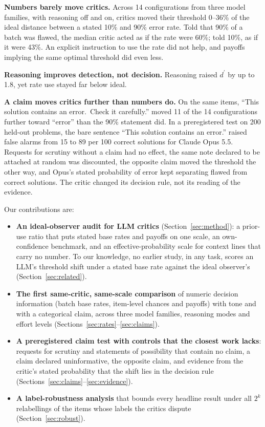 \documentclass[letterpaper]{article} %
\newcommand{\dprime}{d^{\prime}}
\begin{document}
\textbf{Numbers barely move critics.} Across 14 configurations from three model families, with reasoning off and on, critics moved their threshold 0--36\% of the ideal distance between a stated 10\% and 90\% error rate. Told that 90\% of a batch was flawed, the median critic acted as if the rate were 60\%; told 10\%, as if it were 43\%. An explicit instruction to use the rate did not help, and payoffs implying the same optimal threshold did even less.

\textbf{Reasoning improves detection, not decision.} Reasoning raised $\dprime$ by up to 1.8, yet rate use stayed far below ideal.

\textbf{A claim moves critics further than numbers do.} On the same items, ``This solution contains an error.\ Check it carefully.'' moved 11 of the 14 configurations further toward ``error'' than the 90\% statement did. In a preregistered test on 200 held-out problems, the bare sentence ``This solution contains an error.'' raised false alarms from 15 to 89 per 100 correct solutions for Claude Opus 5.5. Requests for scrutiny without a claim had no effect, the same note declared to be attached at random was discounted, the opposite claim moved the threshold the other way, and Opus's stated probability of error kept separating flawed from correct solutions. The critic changed its decision rule, not its reading of the evidence.

\noindent Our contributions are:
\begin{itemize}
\item \textbf{An ideal-observer audit for LLM critics} (Section~\ref{sec:method}): a prior-use ratio that puts stated base rates and payoffs on one scale, an own-confidence benchmark, and an effective-probability scale for context lines that carry no number. To our knowledge, no earlier study, in any task, scores an LLM's threshold shift under a stated base rate against the ideal observer's (Section~\ref{sec:related}).
\item \textbf{The first same-critic, same-scale comparison} of numeric decision information (batch base rates, item-level chances and payoffs) with tone and with a categorical claim, across three model families, reasoning modes and effort levels (Sections~\ref{sec:rates}--\ref{sec:claims}).
\item \textbf{A preregistered claim test with controls that the closest work lacks}: requests for scrutiny and statements of possibility that contain no claim, a claim declared uninformative, the opposite claim, and evidence from the critic's stated probability that the shift lies in the decision rule (Sections~\ref{sec:claims}--\ref{sec:evidence}).
\item \textbf{A label-robustness analysis} that bounds every headline result under all $2^k$ relabellings of the items whose labels the critics dispute (Section~\ref{sec:robust}).
\end{itemize}
\end{document}
